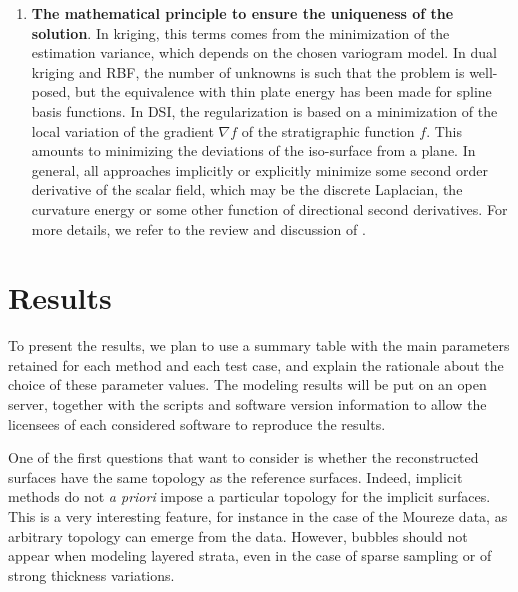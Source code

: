 \documentclass[preprint]{elsarticle}
\begin{document}
\begin{enumerate}
\item \textbf{The mathematical principle to ensure the uniqueness of the solution}. In kriging, this terms comes from the minimization of the estimation variance, which depends on the chosen variogram model. In dual kriging and RBF, the number of unknowns is such that the problem is well-posed, but the equivalence with thin plate energy has been made for spline basis functions. In DSI, the regularization is based on a minimization of the local variation of the gradient $\nabla f$ of the stratigraphic function $f$. This amounts to minimizing the deviations of the iso-surface from a plane. In general, all approaches implicitly or explicitly minimize some second order derivative of the scalar field, which may be the discrete Laplacian, the curvature energy or some other function of directional second derivatives. For more details, we refer to the review and discussion of \citet{Renaudeau2019MG}.

\end{enumerate}


\section{Results}\label{sec:results}


To present the results, we plan to use a summary table with the main parameters retained for each method and each test case, and explain the rationale about the choice of these parameter values. The modeling results will be put on an open server, together with the scripts and software version information to allow the licensees of each considered software to reproduce the results. 


One of the first questions that want to consider is whether the reconstructed surfaces have the same topology as the reference surfaces. Indeed, implicit methods do not \textit{a priori} impose a particular topology for the implicit surfaces. This is a very interesting feature, for instance in the case of the Moureze data, as arbitrary topology can emerge from the data. However, bubbles should not appear when modeling layered strata, even in the case of sparse sampling or of strong thickness variations. 
\end{document}
